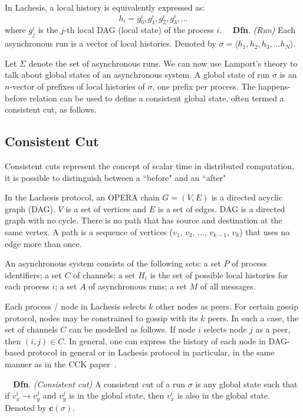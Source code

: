 \documentclass{article}
\newcommand{\dfnn}[2]{$\quad$\textbf{Dfn}. \emph{(#1)} {#2}}
\renewcommand{\vec}[1]{\mathbf{#1}}
\begin{document}
In Lachesis, a local history is equivalently expressed as:
$$h_i = g_0^i, g_1^i, g_2^i, g_3^i, \dots$$
where $g_j^i$ is the $j$-th local DAG (local state) of the process $i$.
\dfnn{Run}{Each asynchronous run is a vector of local histories. Denoted by
	$\sigma = \langle h_1,h_2,h_3,...h_N \rangle$.}

Let $\Sigma$ denote the set of asynchronous runs. We can now use Lamport’s theory to talk about global states of an asynchronous system. A global state of run $\sigma$ is an $n$-vector of prefixes of local histories of $\sigma$, one prefix per process. The happens-before relation can be used to define a consistent global state, often termed a consistent cut, as follows.

\subsection{Consistent Cut} 

Consistent cuts represent the concept of scalar time in distributed computation, it is possible to distinguish between a ``before" and an ``after"

In the Lachesis protocol, an OPERA chain $G=(V, E)$ is a directed acyclic graph (DAG). $V$ is a set of vertices and $E$ is a set of edges. DAG is a directed graph with no cycle. There is no path that has source and destination at the same vertex.
A path is a sequence of vertices ($v_1$, $v_2$, ..., $v_{k-1}$, $v_k$) that uses no edge more than once. 

An asynchronous system consists of the following sets: a set $P$ of process identifiers; a set $C$ of channels; a set $H_i$ is the set of possible local histories for each process $i$; a set $A$ of asynchronous runs; a set $M$ of all messages.

Each process / node in Lachesis selects $k$ other nodes as peers. 
For certain gossip protocol, nodes may be constrained to gossip with its $k$ peers. In such a case, the set of channels $C$ can be modelled as follows.
If node $i$ selects node $j$ as a peer, then $(i,j) \in C$. In general, one can express the history of each node in DAG-based protocol in general or in Lachesis protocol in particular, in the same manner as in the CCK paper~\cite{cck92}.


\dfnn{Consistent cut}{A consistent cut of a run $\sigma$ is any global state such that if $v_x^i \rightarrow v_y^j$ and $v_y^j$ is in the global state, then $v_x^i$ is also in the global state. Denoted by $\vec{c}(\sigma)$.}
\end{document}
